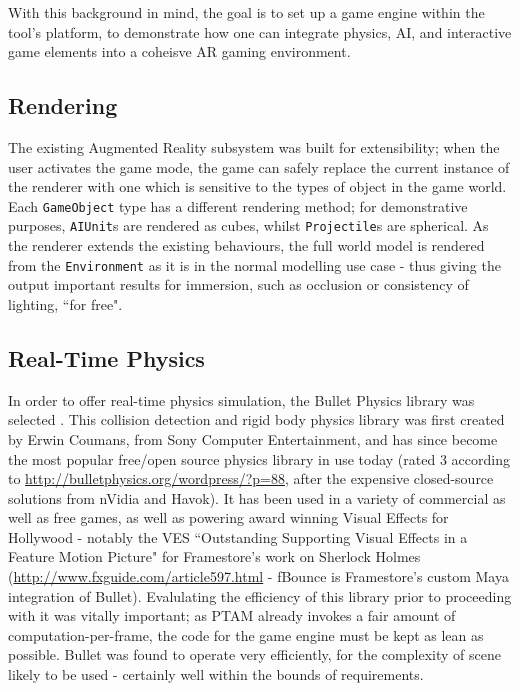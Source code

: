 \documentclass[a4paper,10pt]{article}
\begin{document}
With this background in mind, the goal is to set up a game engine within the tool's platform, to demonstrate how one can integrate physics, AI, and interactive game elements into a coheisve AR gaming environment.

\subsection{Rendering}
The existing Augmented Reality subsystem was built for extensibility; when the user activates the game mode, the game can safely replace the current instance of the renderer with one which is sensitive to the types of object in the game world. Each \texttt{GameObject} type has a different rendering method; for demonstrative purposes, \texttt{AIUnit}s are rendered as cubes, whilst \texttt{Projectile}s are spherical. As the renderer extends the existing behaviours, the full world model is rendered from the \texttt{Environment} as it is in the normal modelling use case - thus giving the output important results for immersion, such as occlusion or consistency of lighting, ``for free".

\subsection{Real-Time Physics}
In order to offer real-time physics simulation, the Bullet Physics library was selected \cite{bullet}. This collision detection and rigid body physics library was first created by Erwin Coumans, from Sony Computer Entertainment, and has since become the most popular free/open source physics library in use today (rated 3 according to \url{http://bulletphysics.org/wordpress/?p=88}, after the expensive closed-source solutions from nVidia and Havok). It has been used in a variety of commercial as well as free games, as well as powering award winning Visual Effects for Hollywood - notably the VES ``Outstanding Supporting Visual Effects in a Feature Motion Picture" for Framestore's work on Sherlock Holmes (\url{http://www.fxguide.com/article597.html} - fBounce is Framestore's custom Maya integration of Bullet). Evalulating the efficiency of this library prior to proceeding with it was vitally important; as PTAM already invokes a fair amount of computation-per-frame, the code for the game engine must be kept as lean as possible. Bullet was found to operate very efficiently, for the complexity of scene likely to be used - certainly well within the bounds of requirements.
\end{document}
